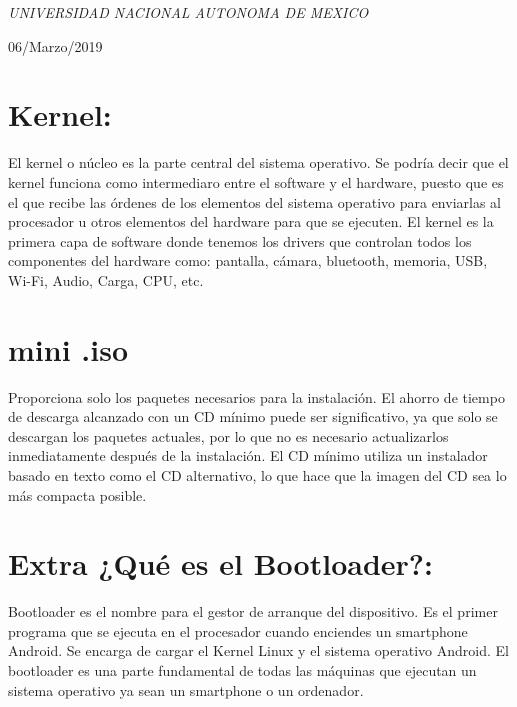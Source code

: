 \documentclass[a4paper, 11pt, oneside]{article}
\begin{document}
\begin{titlepage}
	\textit{UNIVERSIDAD NACIONAL AUTONOMA DE MEXICO} 
	
	\vfill
	
	
	
	
	\vspace{0.3\baselineskip} 
	
	06/Marzo/2019 
	
	 

\end{titlepage}

\section*{Kernel:}
El kernel o núcleo es la parte central del sistema operativo. Se podría decir que el kernel funciona como intermediaro entre el software y el hardware, puesto que es el que recibe las órdenes de los elementos del sistema operativo para enviarlas al procesador u otros elementos del hardware para que se ejecuten. El kernel es la primera capa de software donde tenemos los drivers que controlan todos los componentes del hardware como: pantalla, cámara, bluetooth, memoria, USB, Wi-Fi, Audio, Carga, CPU, etc. 

\section*{mini .iso}
Proporciona solo los paquetes necesarios para la instalación. El ahorro de tiempo de descarga alcanzado con un CD mínimo puede ser significativo, ya que solo se descargan los paquetes actuales, por lo que no es necesario actualizarlos inmediatamente después de la instalación. El CD mínimo utiliza un instalador basado en texto como el CD alternativo, lo que hace que la imagen del CD sea lo más compacta posible.

\section*{Extra ¿Qué es el Bootloader?:}
Bootloader es el nombre para el gestor de arranque del dispositivo. Es el primer programa que se ejecuta en el procesador cuando enciendes un smartphone Android. Se encarga de cargar el Kernel Linux y el sistema operativo Android. El bootloader es una parte fundamental de todas las máquinas que ejecutan un sistema operativo ya sean un smartphone o un ordenador.
\end{document}
